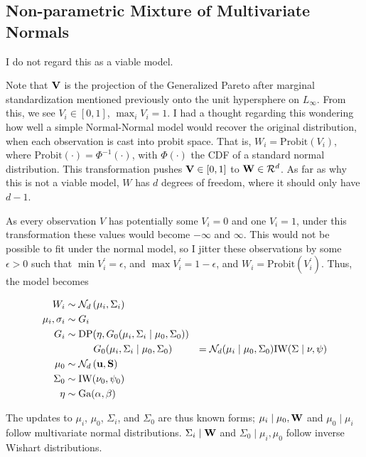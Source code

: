 
\subsection{Non-parametric Mixture of Multivariate Normals}
\label{method:npprobitnorm}

I do not regard this as a viable model.

Note that ${\bf V}$ is the projection of the Generalized Pareto after marginal standardization
  mentioned previously onto the unit hypersphere on $L_{\infty}$.  From this, we see
  $V_{i}\in [0,1]$, $\max_i V_i = 1$. I had a thought regarding this wondering how well a simple
  Normal-Normal model would recover the original distribution, when each observation is cast into
  probit space.  That is, $W_i = \text{Probit}(V_i)$, where
  $\text{Probit}(\cdot) = \Phi^{-1}(\cdot)$, with $\Phi(\cdot)$ the CDF of a standard normal
  distribution.  This transformation pushes ${\bf V} \in [0,1]$ to ${\bf W} \in \mathcal{R}^{d}$.
  As far as why this is not a viable model, $W$ has $d$ degrees of freedom, where it should only
  have $d-1$.

As every observation $V$ has potentially some $V_i = 0$ and one $V_i = 1$, under this
  transformation these values would become $-\infty$ and $\infty$.  This would not be possible to
  fit under the normal model, so I jitter these observations by some $\epsilon > 0$ such that
  $\min V_i^{\prime} = \epsilon$, and $\max V_i^{\prime} = 1 - \epsilon$, and
  $W_i = \text{Probit}(V_i^{\prime})$.  Thus, the model becomes

\begin{equation}
  \begin{aligned}
    W_i &\sim \mathcal{N}_d\left(\mu_i, \Sigma_i\right)\\
    \mu_i, \sigma_i &\sim G_i\\
    G_i &\sim \text{DP}(\eta, G_0(\mu_i,\Sigma_i\mid\mu_0,\Sigma_0))\\
    &\hspace{1cm}G_0(\mu_i,\Sigma_i\mid\mu_0,\Sigma_0) &=
        \mathcal{N}_d(\mu_i\mid\mu_0,\Sigma_0)\text{IW}(\Sigma\mid\nu,\psi)\\
    \mu_0 &\sim \mathcal{N}_d\left({\bf u},{\bf S}\right)\\
    \Sigma_0 &\sim \text{IW}(\nu_0,\psi_0)\\
    \eta &\sim \text{Ga}(\alpha, \beta)
  \end{aligned}
\end{equation}

The updates to $\mu_i$, $\mu_0$, $\Sigma_i$, and $\Sigma_0$ are thus known forms;
  $\mu_i\mid\mu_0,{\bf W}$ and $\mu_0\mid\mu_i$ follow multivariate normal distributions.
  $\Sigma_i\mid{\bf W}$ and $\Sigma_0\mid\mu_i,\mu_0$ follow inverse Wishart distributions.

